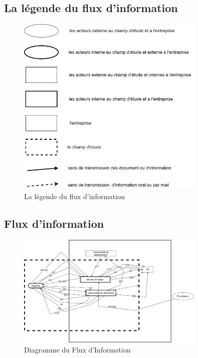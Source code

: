     \subsection{La légende du flux d’information}
        \begin{figure}[H]
            \centering
            \includegraphics[width=0.8\textwidth]{images/legende.png}
            \caption{La légende du flux d’information}
            \label{fig:La légende du flux d’information}
        \end{figure}
        \newpage
    \subsection{Flux d’information}
        \begin{figure}[ht!]
            \centering
            \includegraphics[width=0.8\textwidth]{images/Flux.png}
            \caption{Diagramme  du Flux d'Information}
            \label{fig:Diagramme  du Flux d'Information}
        \end{figure}
